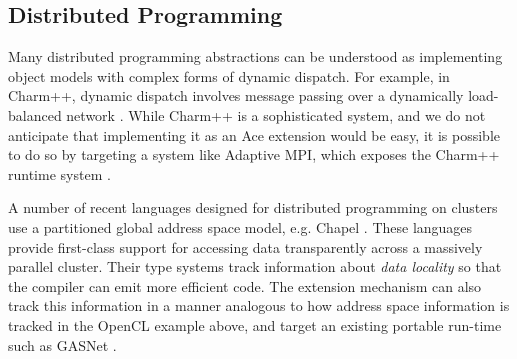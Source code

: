 \documentclass[10pt,preprint]{sigplanconf}
\begin{document}
{\subsection{Distributed Programming}
Many distributed programming abstractions can be understood as implementing object models with complex forms of dynamic dispatch. For example, in Charm++, dynamic dispatch involves message passing over a dynamically load-balanced network \cite{kale2009charm++}. While Charm++ is a sophisticated system, and we do not anticipate that implementing it as an Ace extension would be easy, it is possible to do so by targeting a system like Adaptive MPI, which exposes the Charm++ runtime system \cite{kale2009charm++}. %

%

A number of recent languages designed for distributed programming on clusters use a partitioned global address space model, e.g. Chapel \cite{chapel}. These languages provide first-class support for accessing data transparently across a massively parallel cluster. Their type systems track information about \emph{data locality} so that the compiler can emit more efficient code. The extension mechanism can also track this information in a manner analogous to how address space information is tracked in the OpenCL example above, and target an existing portable run-time such as GASNet \cite{bonachea2002gasnet}.

}
\end{document}
